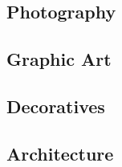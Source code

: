\documentclass[
10pt, %
a4paper, %
oneside, %
headinclude,footinclude, %
BCOR5mm, %
]{scrartcl}
\theoremstyle{definition} %
\theoremstyle{plain} %
\theoremstyle{remark} %
\begin{document}
\subsection{Photography}

\subsection{Graphic Art}

\subsection{Decoratives}

\subsection{Architecture}
\end{document}
